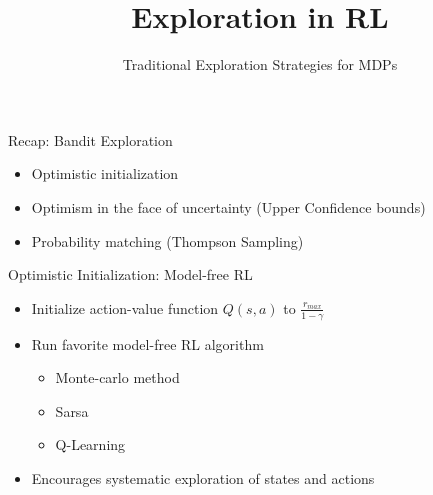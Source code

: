 \documentclass[aspectratio=169]{../latex_main/tntbeamer}  %
\title[RL: Exploration]{Exploration in RL}
\subtitle{Traditional Exploration Strategies for MDPs}
\begin{document}
	
	\maketitle

\begin{frame}[c]{Recap: Bandit Exploration}

\begin{itemize}
	\item Optimistic initialization
	\item Optimism in the face of uncertainty (Upper Confidence bounds)
	\item Probability matching (Thompson Sampling)
\end{itemize}

\end{frame}
\begin{frame}[c]{Optimistic Initialization: Model-free RL}
	
	\begin{itemize}
		\item Initialize action-value function $Q(s,a)$ to $\frac{r_{max}}{1-\gamma}$
		\item Run favorite model-free RL algorithm
		\begin{itemize}
			\item Monte-carlo method
			\item Sarsa
			\item Q-Learning
		\end{itemize}
		\item Encourages systematic exploration of states and actions
	\end{itemize}
	
\end{frame}
\end{document}
